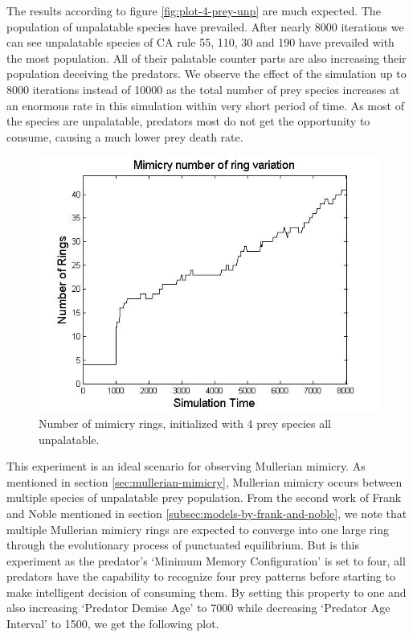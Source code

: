 The results according to figure \ref{fig:plot-4-prey-unp} are much expected. The population of unpalatable species have prevailed. After nearly 8000 iterations we can see unpalatable species of CA rule 55, 110, 30 and 190 have prevailed with the most population. All of their palatable counter parts are also increasing their population deceiving the predators. We observe the effect of the simulation up to 8000 iterations instead of 10000 as the total number of prey species increases at an enormous rate in this simulation within very short period of time. As most of the species are unpalatable, predators most do not get the opportunity to consume, causing a much lower prey death rate. 

\begin{figure}[H]
	\centering
	\includegraphics[scale=0.50]{images/ringSize8k-4Prey-unp}
	\caption[Number of mimicry rings (4 prey species all unpalatable)]{Number of mimicry rings, initialized with 4 prey species all unpalatable.}
	\label{fig:ringSize10k-4-Prey-unp}
\end{figure}

This experiment is an ideal scenario for observing Mullerian mimicry. As mentioned in section \ref{sec:mullerian-mimicry}, Mullerian mimicry occurs between multiple species of unpalatable prey population. From the second work of Frank and Noble \cite{franks2003} mentioned in section \ref{subsec:models-by-frank-and-noble}, we note that multiple Mullerian mimicry rings are expected to converge into one large ring through the evolutionary process of punctuated equilibrium. But is this experiment as the predator's `Minimum Memory Configuration' is set to four, all predators have the capability to recognize four prey patterns before starting to make intelligent decision of consuming them. By setting this property to one and also increasing `Predator Demise Age' to 7000 while decreasing `Predator Age Interval' to 1500, we get the following plot. 

